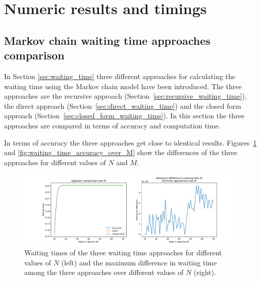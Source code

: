\section{Numeric results and timings}\label{sec:numeric_results_and_timings}


\subsection{Markov chain waiting time approaches comparison}
\label{sec:waiting_time_approach_comparison}

In Section \ref{sec:waiting_time} three different approaches for calculating
the waiting time using the Markov chain model have been introduced.
The three approaches are the recursive approach
(Section~\ref{sec:recursive_waiting_time}), the direct approach
(Section~\ref{sec:direct_waiting_time}) and the closed form
approach (Section~\ref{sec:closed_form_waiting_time}).
In this section the three approaches are compared in terms of accuracy and
computation time.

In terms of accuracy the three approaches get close to identical results.
Figures~\ref{fig:waiting_time_accuracy_over_N} and
\ref{fig:waiting_time_accuracy_over_M} show the differences of the three
approaches for different values of \(N\) and \(M\).


\begin{figure}[H]
    \includegraphics[width=\textwidth]{chapters/03_queueing_model/Bin/numeric_results_and_timings/waiting_time_formulas_comparison/waiting_time_over_N.pdf}
    \caption{
        Waiting times of the three waiting time approaches for different
        values of \(N\) (left) and the maximum difference in waiting time among
        the three approaches over different values of \(N\) (right).
    }
    \label{fig:waiting_time_accuracy_over_N}
\end{figure}

